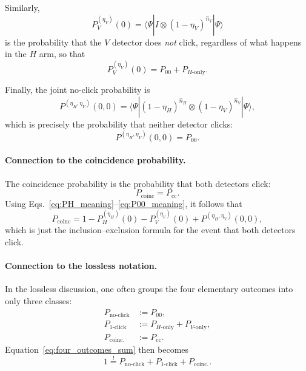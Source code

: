 \documentclass[%
 reprint,
 amsmath,amssymb,
 aps,
twocolumn
]{revtex4-2}
\begin{document}
Similarly,
\begin{equation}
P_V^{(\eta_V)}(0)
=
\langle \Psi | I\otimes (1-\eta_V)^{\hat n_V} |\Psi\rangle
\end{equation}
is the probability that the $V$ detector does \emph{not} click, regardless of what happens in the $H$ arm, so that
\begin{equation}
P_V^{(\eta_V)}(0) = P_{00} + P_{H\text{-only}}.
\label{eq:PV_meaning}
\end{equation}

Finally, the joint no-click probability is
\begin{equation}
P^{(\eta_H,\eta_V)}(0,0)
=
\langle \Psi | (1-\eta_H)^{\hat n_H}\otimes (1-\eta_V)^{\hat n_V} |\Psi\rangle,
\end{equation}
which is precisely the probability that neither detector clicks:
\begin{equation}
P^{(\eta_H,\eta_V)}(0,0)=P_{00}.
\label{eq:P00_meaning}
\end{equation}

\paragraph{Connection to the coincidence probability.}

The coincidence probability is the probability that both detectors click:
\begin{equation}
P_{\mathrm{coinc}}
=
P_{\mathrm{cc}}.
\end{equation}
Using Eqs.~\eqref{eq:PH_meaning}--\eqref{eq:P00_meaning}, it follows that
\begin{equation}
P_{\mathrm{coinc}}
=
1 - P_H^{(\eta_H)}(0) - P_V^{(\eta_V)}(0) + P^{(\eta_H,\eta_V)}(0,0),
\label{eq:Pcoinc_inclusion_exclusion}
\end{equation}
which is just the inclusion--exclusion formula for the event that both detectors click.

\paragraph{Connection to the lossless notation.}

In the lossless discussion, one often groups the four elementary outcomes into only three classes:
\begin{align}
P_{\text{no-click}} &:= P_{00},\\
P_{\text{1-click}} &:= P_{H\text{-only}} + P_{V\text{-only}},\\
P_{\text{coinc.}} &:= P_{\mathrm{cc}}.
\end{align}
Equation~\eqref{eq:four_outcomes_sum} then becomes
\begin{equation}
1 \overset{!}{=} P_{\text{no-click}} + P_{\text{1-click}} + P_{\text{coinc.}}.
\label{eq:lossless_grouped}
\end{equation}
\end{document}
